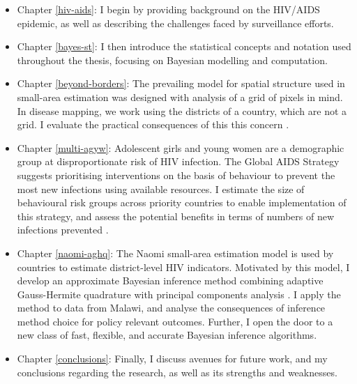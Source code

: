 \documentclass[a4paper, nobind]{templates/ociamthesis}
\providecommand{\tightlist}{%
  \setlength{\itemsep}{0pt}\setlength{\parskip}{0pt}}
\begin{document}
\begin{itemize}
\tightlist
\item
  Chapter \ref{hiv-aids}: I begin by providing background on the HIV/AIDS epidemic, as well as describing the challenges faced by surveillance efforts.
\item
  Chapter \ref{bayes-st}: I then introduce the statistical concepts and notation used throughout the thesis, focusing on Bayesian modelling and computation.
\item
  Chapter \ref{beyond-borders}: The prevailing model for spatial structure used in small-area estimation \autocite{besag1991bayesian} was designed with analysis of a grid of pixels in mind.
  In disease mapping, we work using the districts of a country, which are not a grid.
  I evaluate the practical consequences of this this concern \autocite{howes2023beyond}.
\item
  Chapter \ref{multi-agyw}: Adolescent girls and young women are a demographic group at disproportionate risk of HIV infection.
  The Global AIDS Strategy suggests prioritising interventions on the basis of behaviour to prevent the most new infections using available resources.
  I estimate the size of behavioural risk groups across priority countries to enable implementation of this strategy, and assess the potential benefits in terms of numbers of new infections prevented \autocite{howes2023spatio}.
\item
  Chapter \ref{naomi-aghq}: The Naomi small-area estimation model \autocite{eaton2021naomi} is used by countries to estimate district-level HIV indicators.
  Motivated by this model, I develop an approximate Bayesian inference method combining adaptive Gauss-Hermite quadrature with principal components analysis \autocite{howes2023fast}.
  I apply the method to data from Malawi, and analyse the consequences of inference method choice for policy relevant outcomes.
  Further, I open the door to a new class of fast, flexible, and accurate Bayesian inference algorithms.
\item
  Chapter \ref{conclusions}: Finally, I discuss avenues for future work, and my conclusions regarding the research, as well as its strengths and weaknesses.
\end{itemize}
\end{document}
